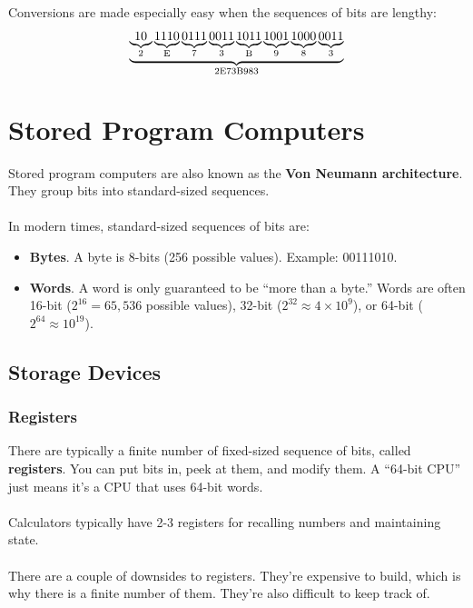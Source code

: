 \documentclass[]{article}
\theoremstyle{definition}
\begin{document}
			Conversions are made especially easy when the sequences of bits are lengthy:
			\begin{align*}
			  \underbrace{\underbrace{10}_{2} \underbrace{1110}_{\text E} \underbrace{0111}_{7} \underbrace{0011}_{3} \underbrace{1011}_{\text B} \underbrace{1001}_{9} \underbrace{1000}_{8} \underbrace{0011}_{3}}_{\text{2E73B983}}
			\end{align*}
	\section{Stored Program Computers}
		Stored program computers are also known as the \textbf{Von Neumann architecture}. They group bits into standard-sized sequences. 
		\\ \\
		In modern times, standard-sized sequences of bits are:
		\begin{itemize}
			\item \textbf{Bytes}. A byte is 8-bits (256 possible values). Example: 00111010.
			\item \textbf{Words}. A word is only guaranteed to be ``more than a byte.'' Words are often 16-bit ($2^{16} = 65,536$ possible values), 32-bit ($2^{32} \approx 4 \times 10^9$), or 64-bit ($2^{64} \approx 10^{19}$).
		\end{itemize}
		
		\subsection{Storage Devices}
			\subsubsection{Registers}
				There are typically a finite number of fixed-sized sequence of bits, called \textbf{registers}. You can put bits in, peek at them, and modify them. A ``64-bit CPU'' just means it's a CPU that uses 64-bit words. 
				\\ \\
				Calculators typically have 2-3 registers for recalling numbers and maintaining state.
				\\ \\
				There are a couple of downsides to registers. They're expensive to build, which is why there is a finite number of them. They're also difficult to keep track of.
\end{document}
